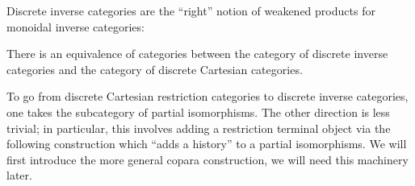 Discrete inverse categories are the ``right'' notion of weakened products for monoidal inverse categories:

\begin{theorem}\cite[Thm. 5.2.6]{giles}
There is an equivalence of categories between the category of discrete inverse categories and the category of discrete Cartesian categories.
\end{theorem}

To go from  discrete Cartesian restriction categories to discrete inverse categories, one takes the subcategory of partial isomorphisms.
The other direction is less trivial; in particular, this involves adding a restriction terminal object via the following construction which ``adds a history'' to a partial isomorphisms.  We will first introduce the more general copara construction, we will need this machinery later.

